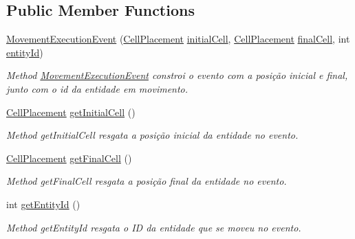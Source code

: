 \subsection*{Public Member Functions}
\begin{DoxyCompactItemize}
\item 
\hyperlink{classbr_1_1unb_1_1unbomber_1_1event_1_1_movement_execution_event_a96d5620ebee6c074a1f97e88d865e402}{Movement\+Execution\+Event} (\hyperlink{classbr_1_1unb_1_1unbomber_1_1component_1_1_cell_placement}{Cell\+Placement} \hyperlink{classbr_1_1unb_1_1unbomber_1_1event_1_1_movement_execution_event_a983de322d2ea854004ab7851ba23d7e3}{initial\+Cell}, \hyperlink{classbr_1_1unb_1_1unbomber_1_1component_1_1_cell_placement}{Cell\+Placement} \hyperlink{classbr_1_1unb_1_1unbomber_1_1event_1_1_movement_execution_event_acccd6d576e3d1138d3a503ff7513cc5a}{final\+Cell}, int \hyperlink{classbr_1_1unb_1_1unbomber_1_1event_1_1_movement_execution_event_aeedd19a6a271627531cc6f0408195409}{entity\+Id})
\begin{DoxyCompactList}\small\item\em Method \hyperlink{classbr_1_1unb_1_1unbomber_1_1event_1_1_movement_execution_event}{Movement\+Execution\+Event} constroi o evento com a posição inicial e final, junto com o id da entidade em movimento. \end{DoxyCompactList}\item 
\hyperlink{classbr_1_1unb_1_1unbomber_1_1component_1_1_cell_placement}{Cell\+Placement} \hyperlink{classbr_1_1unb_1_1unbomber_1_1event_1_1_movement_execution_event_a6ddde09a69866a36f880f33a77641e4f}{get\+Initial\+Cell} ()
\begin{DoxyCompactList}\small\item\em Method get\+Initial\+Cell resgata a posição inicial da entidade no evento. \end{DoxyCompactList}\item 
\hyperlink{classbr_1_1unb_1_1unbomber_1_1component_1_1_cell_placement}{Cell\+Placement} \hyperlink{classbr_1_1unb_1_1unbomber_1_1event_1_1_movement_execution_event_a5b3316f39c9fd537fcc4a3a5dab86c04}{get\+Final\+Cell} ()
\begin{DoxyCompactList}\small\item\em Method get\+Final\+Cell resgata a posição final da entidade no evento. \end{DoxyCompactList}\item 
int \hyperlink{classbr_1_1unb_1_1unbomber_1_1event_1_1_movement_execution_event_a31f464e5d2151d3b1e445aa42f684291}{get\+Entity\+Id} ()
\begin{DoxyCompactList}\small\item\em Method get\+Entity\+Id resgata o I\+D da entidade que se moveu no evento. \end{DoxyCompactList}\end{DoxyCompactItemize}
